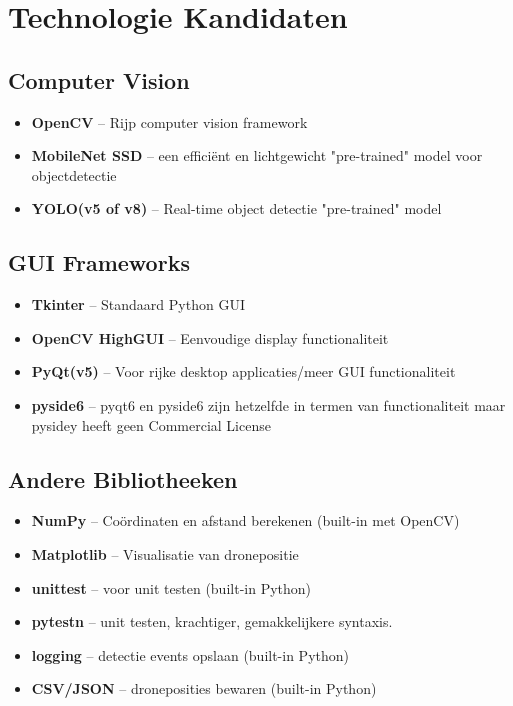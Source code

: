 \documentclass[11pt,a4paper]{scrartcl}
\begin{document}
\section{Technologie Kandidaten}

\subsection{Computer Vision}
\begin{itemize}[leftmargin=*]
    \item \textbf{OpenCV} -- Rijp computer vision framework
    \item \textbf{MobileNet SSD} -- een efficiënt en lichtgewicht "pre-trained" model voor objectdetectie
    \item \textbf{YOLO(v5 of v8)} -- Real-time object detectie "pre-trained" model
\end{itemize}

\subsection{GUI Frameworks}
\begin{itemize}[leftmargin=*]
    \item \textbf{Tkinter} -- Standaard Python GUI
    \item \textbf{OpenCV HighGUI} -- Eenvoudige display functionaliteit
    \item \textbf{PyQt(v5)} -- Voor rijke desktop applicaties/meer GUI functionaliteit
    \item \textbf{pyside6} -- pyqt6 en pyside6 zijn hetzelfde in termen van functionaliteit maar pysidey heeft geen Commercial License
    
    
\end{itemize}


\subsection{Andere Bibliotheeken}
\begin{itemize}[leftmargin=*]
    \item \textbf{NumPy} -- Coördinaten en afstand berekenen (built-in met OpenCV)
    \item \textbf{Matplotlib} -- Visualisatie van dronepositie
    \item \textbf{unittest} -- voor unit testen (built-in Python)
    \item \textbf{pytestn} -- unit testen, krachtiger, gemakkelijkere syntaxis.
    \item \textbf{logging} -- detectie events opslaan (built-in Python)
    \item \textbf{CSV/JSON} -- droneposities bewaren (built-in Python)
\end{itemize}
\end{document}
